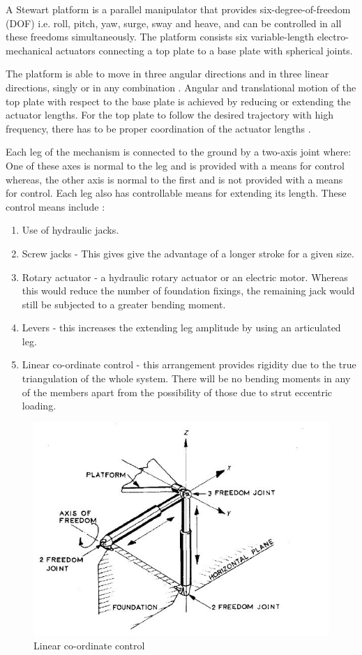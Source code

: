 A Stewart platform is a parallel manipulator that provides six-degree-of-freedom (DOF) i.e. roll, pitch, yaw, surge, sway and heave, and can be controlled in all these freedoms simultaneously. The platform consists six variable-length electro-mechanical actuators connecting a top plate to a base plate with spherical joints.

The platform is able to move in three angular directions and in three linear directions, singly or in any combination \cite{stewart1965platform}. Angular and translational motion of the top plate with
respect to the base plate is achieved by reducing or extending the actuator lengths. For the top plate to follow the desired trajectory with high frequency, there has to be proper coordination of the actuator lengths \cite{iqbal_dynamic_2008}.

Each leg of the mechanism is connected to the ground by a two-axis joint where: One of these axes is
normal to the leg and is provided with a means for control whereas, the other axis is normal to the first and is not provided with a means for control.
Each leg also has controllable means for extending its length. These control means include \cite{stewart1965platform}:
\begin{enumerate}
\item Use of hydraulic jacks.
\item Screw jacks - This gives give the advantage of
a longer stroke for a given size.
\item Rotary actuator - a hydraulic rotary actuator or an electric motor. Whereas this would reduce the number of foundation fixings, the remaining jack would still be subjected to a greater bending moment.
\item Levers - this increases the extending leg amplitude by using an articulated leg.
\item Linear co-ordinate control - this arrangement provides rigidity due to the true triangulation of
the whole system. There will be no bending moments in any of the members apart from the possibility of those due to strut eccentric loading. 
\end{enumerate}
\begin{center}
	\begin{figure}[H]
	\centering
	\includegraphics[width=0.6\linewidth]{Figures/Fig11}
	\caption[Linear co-ordinate control]{Linear co-ordinate control \cite{stewart1965platform}}
	\end{figure}
\end{center}


